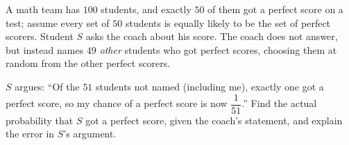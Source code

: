 A math team has $100$ students, and exactly $50$ of them got a perfect score on a test; assume every set of $50$ students is equally likely to be the set of perfect scorers. Student $S$ asks the coach about his score. The coach does not answer, but instead names $49$ \emph{other} students who got perfect scores, choosing them at random from the other perfect scorers.

$S$ argues: ``Of the $51$ students not named (including me), exactly one got a perfect score, so my chance of a perfect score is now $\dfrac{1}{51}$.'' Find the actual probability that $S$ got a perfect score, given the coach's statement, and explain the error in $S$'s argument.
